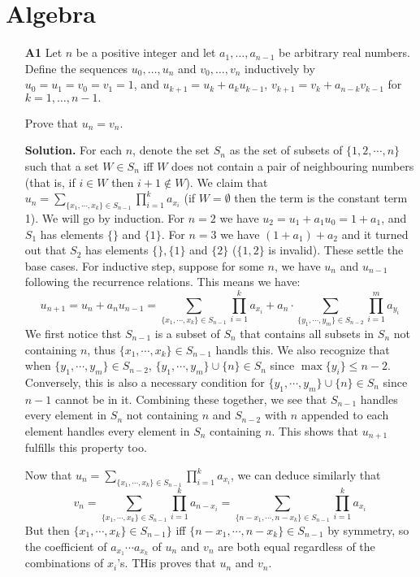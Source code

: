 \documentclass[11pt,a4paper]{article}
\begin{document}
\newcommand{\la}{\leftarrow}
\newcommand{\lra}{\leftrightarrow}
\newcommand{\bbN}{\mathbb{N}}
\newcommand{\bbZ}{\mathbb{Z}}
\newcommand{\dsum}{\displaystyle\sum}
\newcommand{\dprod}{\displaystyle\prod}

\section*{Algebra}
\begin{enumerate}
	\item[\textbf{A1}] Let $n$ be a positive integer and let $a_1, \ldots, a_{n-1} $ be arbitrary real numbers. Define the sequences $u_0, \ldots, u_n $ and $v_0, \ldots, v_n $ inductively by $u_0 = u_1  = v_0 = v_1 = 1$, and $u_{k+1} = u_k + a_k u_{k-1}$,  $v_{k+1} = v_k + a_{n-k} v_{k-1}$ for $k=1, \ldots, n-1.$
	
	Prove that $u_n = v_n.$
	
	\textbf{Solution.} For each $n$, denote the set $S_n$ as the set of subsets of $\{1, 2, \cdots , n\}$ such that a set $W\in S_n$ iff $W$ does not contain a pair of neighbouring numbers (that is, if $i\in W$ then $i+1\not\in W$). We claim that $u_n = \dsum_{\{x_1, \cdots , x_k\}\in S_{n-1}}\dprod_{i=1}^k a_{x_i}$ (if $W=\emptyset$ then the term is the constant term 1). We will go by induction. For $n=2$ we have $u_2=u_1+a_1u_0=1+a_1$, and $S_1$ has elements $\{\}$ and $\{1\}$. For $n=3$ we have $(1+a_1)+a_2$ and it turned out that $S_2$ has elements $\{\}, \{1\}$ and $\{2\}$ ($\{1, 2\}$ is invalid). 
	These settle the base cases. 
	For inductive step, suppose for some $n$, we have $u_n$ and $u_{n-1}$ following the recurrence relations. This means we have: 
	\[
	u_{n+1} = u_n + a_nu_{n-1}
	= \dsum_{\{x_1, \cdots , x_k\}\in S_{n-1}}\dprod_{i=1}^k a_{x_i}
	+ a_n\cdot \dsum_{\{y_1, \cdots , y_m\}\in S_{n-2}}\dprod_{i=1}^m a_{y_i}
	\]
	We first notice thst $S_{n-1}$ is a subset of $S_n$ that contains all subsets in $S_n$ not containing $n$, thus $\{x_1, \cdots , x_k\}\in S_{n-1}$ handls this. 
	We also recognize that when $\{y_1, \cdots , y_m\}\in S_{n-2}$, $\{y_1, \cdots , y_m\}\cup \{n\}\in S_n$ since $\max\{y_i\}\le n-2$. Conversely, this is also a necessary condition for $\{y_1, \cdots , y_m\}\cup \{n\}\in S_n$ since $n-1$ cannot be in it. 
	Combining these together, we see that $S_{n-1}$ handles every element in $S_n$ not containing $n$ and $S_{n-2}$ with $n$ appended to each element handles every element in $S_n$ containing $n$. This shows that $u_{n+1}$ fulfills this property too. 
	
	Now that $u_n = \dsum_{\{x_1, \cdots , x_k\}\in S_{n-1}}\dprod_{i=1}^k a_{x_i}$, we can deduce similarly that \[v_n = \dsum_{\{x_1, \cdots , x_k\}\in S_{n-1}}\dprod_{i=1}^k a_{n - x_i}
	= \dsum_{\{n - x_1, \cdots , n - x_k\}\in S_{n-1}}\dprod_{i=1}^k a_{x_i}
	\]
	But then $\{x_1, \cdots , x_k\}\in S_{n-1}\}$ iff $\{n - x_1, \cdots , n - x_k\}\in S_{n-1}$ by symmetry, so the coefficient of $a_{x_1}\cdots a_{x_k}$ of $u_n$ and $v_n$ are both equal regardless of the combinations of $x_i$'s. THis proves that $u_n$ and $v_n$. 
	

\end{enumerate}
\end{document}

